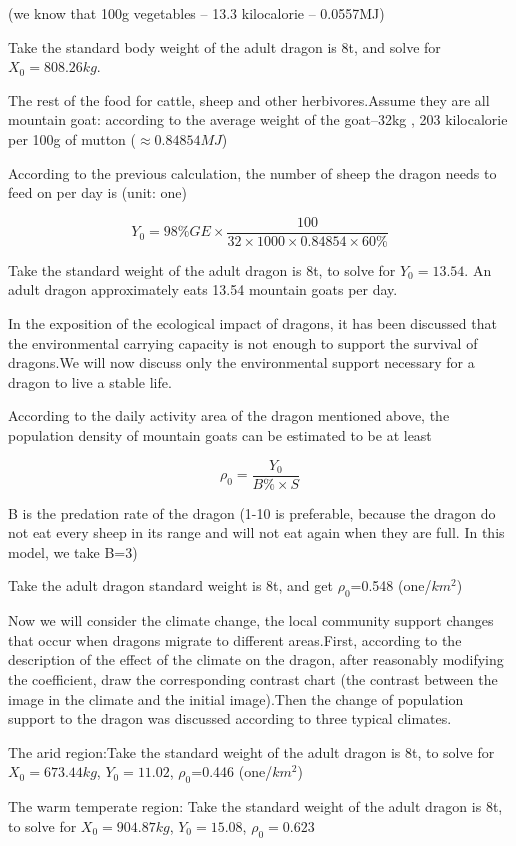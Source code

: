 (we know that 100g vegetables -- 13.3 kilocalorie -- 0.0557MJ\cite{food1})

Take the standard body weight of the adult dragon is 8t, and solve for $X_0=808.26kg$.

The rest of the food for cattle, sheep and other herbivores.Assume they are all mountain goat: according to the average weight of the goat--32kg \cite{food2}, 203 kilocalorie per 100g of mutton ($\approx 0.84854MJ$)

According to the previous calculation, the number of sheep the dragon needs to feed on per day is (unit: one)

\[Y_0=98\%GE \times\frac{100}{32 \times 1000 \times 0.84854 \times 60\%}\]

Take the standard weight of the adult dragon is 8t, to solve for $Y_0=13.54$. An adult dragon approximately eats 13.54 mountain goats per day. 

In the exposition of the ecological impact of dragons, it has been discussed that the environmental carrying capacity is not enough to support the survival of dragons.We will now discuss only the environmental support necessary for a dragon to live a stable life.

According to the daily activity area of the dragon mentioned above, the population density of mountain goats can be estimated to be at least

\[\rho_0=\frac{Y_0}{B\%\times S}\]

B is the predation rate of the dragon (1-10 is preferable, because the dragon do not eat every sheep in its range and will not eat again when they are full. In this model, we take B=3)

Take the adult dragon standard weight is 8t, and get $\rho_0$=0.548 (one/$km^2$)

Now we will consider the climate change, the local community support changes that occur when dragons migrate to different areas.First, according to the description of the effect of the climate on the dragon, after reasonably modifying the coefficient, draw the corresponding contrast chart (the contrast between the image in the climate and the initial image).Then the change of population support to the dragon was discussed according to three typical climates.

The arid region:Take the standard weight of the adult dragon is 8t, to solve for $X_0=673.44kg$, $Y_0=11.02$, $\rho_0$=0.446 (one/$km^2$)

The warm temperate region: Take the standard weight of the adult dragon is 8t, to solve for $X_0=904.87kg$, $Y_0=15.08$, $\rho_0=0.623$

